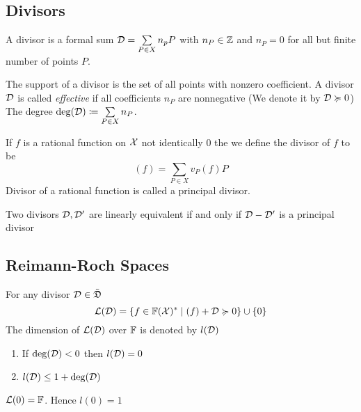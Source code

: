 \subsection{Divisors}
\begin{definition}[Divisor]
	A divisor is a formal sum $\mathcal{D}=\sum\limits_{P\in X}n_pP$ with $n_P\in \mathbb{Z}$ and $n_P=0$ for all but finite number of points $P$.	
\end{definition}
	The support of a divisor is the set of all points with nonzero coefficient. A divisor $\mathcal{D}$ is called \textit{effective}  if all coefficients $n_P$ are nonnegative (We denote it by $\mathcal{D}\succcurlyeq 0$) The degree $\deg(\mathcal{D})\coloneqq \sum\limits_{P\in X}n_P$.
	\begin{definition}
		If $f$ is a rational function on $\mathcal{X}$ not identically $0$ the we define the divisor of $f$ to be $$(f)=\sum_{P\in X}v_P(f)P$$Divisor of a rational function is called a principal divisor.
	\end{definition}
	Two divisors $\mathcal{D},\mathcal{D}'$ are linearly equivalent if and only if $\mathcal{D}-\mathcal{D}'$ is a principal divisor
\subsection{Reimann-Roch Spaces}
\begin{definition}
	For any divisor $\mathcal{D}\in \tilde{\mathfrak{D}}$ $$\mathcal{L}(\mathcal{D})=\{f\in \mathbb{F}(\mathcal{X})^*\mid (f)+\mathcal{D}\succcurlyeq 0 \}\cup \{0\}$$The dimension of $\mathcal{L}(\mathcal{D})$ over $\mathbb{F}$ is denoted by $l(\mathcal{D})$
\end{definition}
\begin{theorem}\label{rrspacedim}
	\begin{enumerate}[label=(\roman*)]
		\item If $\deg(\mathcal{D})<0$ then $l(\mathcal{D})=0$
		\item $l(\mathcal{D})\leq 1+\deg(\mathcal{D})$
	\end{enumerate}
\end{theorem}
\begin{theorem}\label{0divrrspacedim}
	$\mathcal{L}(0)=\mathbb{F}$. Hence $l(0)=1$
\end{theorem}

